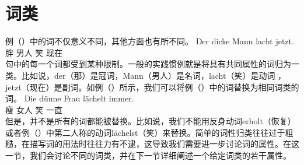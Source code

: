 \section{词类}
\label{Abschnitt-Wortarten}
例（）中的词不仅意义不同，其他方面也有所不同。
\ea
\gll Der dicke Mann lacht jetzt.\\
	 胖 男人 笑 现在\\
\z
句中的每一个词都受到某种限制。一般的实践惯例就是将具有共同属性的词归为一类。比如说，der（那）是冠词，Mann（男人）是名词，lacht（笑）是动词 ，jetzt（现在）是副词。如例（）所示，我们可以将例（）中的词替换为相同词类的词。
\ea
\gll Die dünne Frau lächelt immer.\\
	  瘦 女人 笑 一直\\
\z
但是，并不是所有的词都能被替换。比如说，我们不能用反身动词erholt（恢复）或者例（）中第二人称的动词lächelst（笑）来替换。简单的词性归类往往过于粗糙，在描写词的用法时往往力有不逮，这导致我们需要进一步讨论词的属性。在这一节，我们会讨论不同的词类，并在下一节详细阐述一个给定词类的若干属性。

